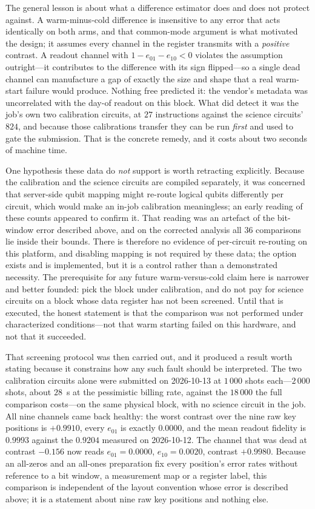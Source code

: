 \documentclass[aps,prxquantum,reprint,superscriptaddress]{revtex4-2}
\begin{document}
The general lesson is about what a difference estimator does and does not protect
against. A warm-minus-cold difference is insensitive to any error that acts
identically on both arms, and that common-mode argument is what motivated the
design; it assumes every channel in the register transmits with a
\emph{positive} contrast. A readout channel with $1-e_{01}-e_{10}<0$ violates the
assumption outright---it contributes to the difference with its sign flipped---so
a single dead channel can manufacture a gap of exactly the size and shape that a
real warm-start failure would produce. Nothing free predicted it: the vendor's
metadata was uncorrelated with the day-of readout on this block. What did detect
it was the job's own two calibration circuits, at $27$ instructions against the
science circuits' $824$, and because those calibrations transfer they can be run
\emph{first} and used to gate the submission. That is the concrete remedy, and it
costs about two seconds of machine time.

One hypothesis these data do \emph{not} support is worth retracting explicitly.
Because the calibration and the science circuits are compiled separately, it was
concerned that server-side qubit mapping might re-route logical qubits differently
per circuit, which would make an in-job calibration meaningless; an early reading
of these counts appeared to confirm it. That reading was an artefact of the
bit-window error described above, and on the corrected analysis all $36$
comparisons lie inside their bounds. There is therefore no evidence of
per-circuit re-routing on this platform, and disabling mapping is not required by
these data; the option exists and is implemented, but it is a control rather than
a demonstrated necessity. The prerequisite for any future warm-versus-cold claim
here is narrower and better founded: pick the block under calibration, and do not
pay for science circuits on a block whose data register has not been screened.
Until that is executed, the honest statement is that the comparison was not
performed under characterized conditions---not that warm starting failed on this
hardware, and not that it succeeded.

That screening protocol was then carried out, and it produced a result worth
stating because it constrains how any such fault should be interpreted. The two
calibration circuits alone were submitted on 2026-10-13 at $1\,000$ shots
each---$2\,000$ shots, about $28$~s at the pessimistic billing rate, against the
$18\,000$ the full comparison costs---on the same physical block, with no science
circuit in the job. All nine channels came back healthy: the worst contrast over
the nine raw key positions is $+0.9910$, every $e_{01}$ is exactly $0.0000$, and
the mean readout fidelity is $0.9993$ against the $0.9204$ measured on
2026-10-12. The channel that was dead at contrast $-0.156$ now reads
$e_{01}=0.0000$, $e_{10}=0.0020$, contrast $+0.9980$. Because an all-zeros and an
all-ones preparation fix every position's error rates without reference to a bit
window, a measurement map or a register label, this comparison is independent of
the layout convention whose error is described above; it is a statement about nine
raw key positions and nothing else.
\end{document}
